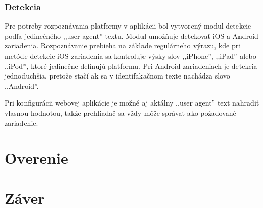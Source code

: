 \subsubsection{Detekcia} %
\label{ssub:detekcia}

Pre potreby rozpoznávania platformy v aplikácii bol vytvorený modul detekcie podľa jedinečného ,,user agent'' textu. Modul umožňuje detekovať iOS a Android zariadenia. Rozpoznávanie prebieha na základe regulárneho výrazu, kde pri metóde detekcie iOS zariadenia sa kontroluje výsky slov ,,iPhone'', ,,iPad'' alebo ,,iPod'', ktoré jedinečne definujú platformu. Pri Android zariadeniach je detekcia jednoduchšia, pretože stačí ak sa v identifakačnom texte nachádza slovo ,,Android''.

Pri konfigurácii webovej aplikácie je možné aj aktálny ,,user agent'' text nahradiť vlasnou hodnotou, takže prehliadač sa vždy môže správať ako požadované zariadenie.




\section{Overenie} %
\label{sec:overenie}


\section{Záver} %
\label{sec:z_ver}

